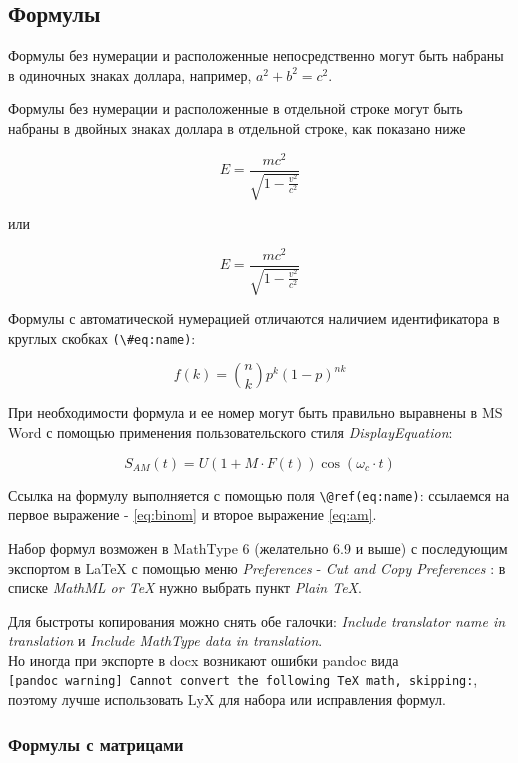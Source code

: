 \documentclass[
  a4paper,
]{book}
\theoremstyle{definition}
\theoremstyle{definition}
\theoremstyle{definition}
\theoremstyle{definition}
\theoremstyle{remark}
\begin{document}
\subsection{Формулы}\label{markdown-syntax-math}

Формулы без нумерации и расположенные непосредственно могут быть набраны в одиночных знаках доллара, например, \(a^2 + b^2 = c^2\).

Формулы без нумерации и расположенные в отдельной строке могут быть набраны в двойных знаках доллара в отдельной строке, как показано ниже

\[ E = \frac{mc^2}{\sqrt{1-\frac{v^2}{c^2}}} \]

или

\[
E = \frac{mc^2}{\sqrt{1-\frac{v^2}{c^2}}}
\]

Формулы с автоматической нумерацией отличаются наличием идентификатора в круглых скобках \texttt{(\textbackslash{}\#eq:name)}:

\begin{equation}
f\left(k\right) =\binom{n}{k} p^k\left(1-p\right)^{n k}
\label{eq:binom}
\end{equation}

При необходимости формула и ее номер могут быть правильно выравнены в MS Word с помощью применения пользовательского стиля \emph{DisplayEquation}:

\begin{equation}
S_{AM}\left( t \right) = U\left( 1+M\cdot F\left( t \right) \right)\cos \left( \omega_c\cdot t \right)
\label{eq:am}
\end{equation}

Ссылка на формулу выполняется с помощью поля \texttt{\textbackslash{}@ref(eq:name)}: ссылаемся на первое выражение - \eqref{eq:binom} и второе выражение \eqref{eq:am}.

Набор формул возможен в MathType 6 (желательно 6.9 и выше) с последующим экспортом в LaTeX с помощью меню \emph{Preferences} - \emph{Cut and Copy Preferences} : в списке \emph{MathML or TeX} нужно выбрать пункт \emph{Plain TeX}.

Для быстроты копирования можно снять обе галочки: \emph{Include translator name in translation} и \emph{Include MathType data in translation}.\\
Но иногда при экспорте в docx возникают ошибки pandoc вида \texttt{{[}pandoc\ warning{]}\ Cannot\ convert\ the\ following\ TeX\ math,\ skipping:}, поэтому лучше использовать LyX для набора или исправления формул.

\subsubsection{Формулы с матрицами}\label{markdown-syntax-math-matrix}
\end{document}
